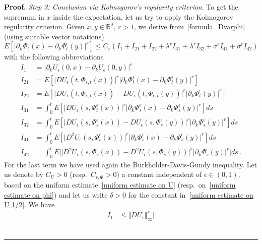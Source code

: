 \documentclass[a4paper,10pt]{article}
\newenvironment{proof}[1][Proof]{\noindent\textbf{#1.} }{\ \rule{0.5em}{0.5em}}
\begin{document}
\begin{proof}
\emph{Step 3: Conclusion via Kolmogorov's regularity criterion}. To get the supremum in $x$ inside the expectation, let us try
to apply the Kolmogorov regularity criterion. Given $x,y\in\mathbb{R}^{d}$, $r>1$,
we derive from~\eqref{formula_Dvarphi} (using suitable vector notations)
\[
E[  \vert \partial_{k}\Phi^{\epsilon}_{t}(x)
-\partial_{k}\Phi^{\epsilon}_{t}(  y)  \vert ^{r}]
\leq C_{r}(  I_{1}+I_{21}+I_{22}+\lambda^{r}I_{31}+\lambda^{r} 
I_{32}+\sigma^{r}I_{41}+\sigma^{r}I_{42})
\]
with the following abbreviations
\begin{align*}
I_{1} & =\vert \partial_{k}U_{\epsilon}(  0,x)  -\partial
_{k}U_{\epsilon}(  0,y)  \vert ^{r} \\[0.1cm]
I_{21}  & =E[  \vert DU_{\epsilon}(  t,\Phi_{\epsilon
,t}(x)  )  \vert ^{r}\vert \partial_{k} 
\Phi^{\epsilon}_{t}(x)  -\partial_{k}\Phi^{\epsilon}_{t}(
y)  \vert ^{r}]  \\[0.1cm]
I_{22}  & =E[  \vert DU_{\epsilon}(  t,\Phi_{\epsilon
,t}(x)  )  -DU_{\epsilon}(  t,\Phi_{\epsilon
,t}(  y)  )  \vert ^{r}\vert \partial_{k}
\Phi^{\epsilon}_{t}(  y)  \vert ^{r}] \\
I_{31}  & =\int_{0}^{t}E[  \vert DU_{\epsilon}(  s,\Phi
^{\epsilon}_{t}(x)  )  \vert ^{r}\vert
\partial_{k}\Phi^{\epsilon}_{s}(x)  -\partial_{k}\Phi
^{\epsilon}_{s}(  y)  \vert ^{r}]  ds\\
I_{32}  & =\int_{0}^{t}E[  \vert DU_{\epsilon}(  s,\Phi
^{\epsilon}_{s}(x)  )  -DU_{\epsilon}(  s,\Phi
^{\epsilon}_{s}(  y)  )  \vert ^{r}\vert
\partial_{k}\Phi^{\epsilon}_{s}(  y)  \vert ^{r}]  ds \\
I_{41}  & =\int_{0}^{t}E[  \vert D^{2}U_{\epsilon}(
s,\Phi^{\epsilon}_{t}(x)  )  \vert ^{r}\vert
\partial_{k}\Phi^{\epsilon}_{s}(x)  -\partial_{k}\Phi
^{\epsilon}_{s}(  y)  \vert ^{r}]  ds\\
I_{42}  & =\int_{0}^{t}E\big[  \vert D^{2}U_{\epsilon}(
s,\Phi^{\epsilon}_{s}(x)  )  -D^{2}U_{\epsilon}(
s,\Phi^{\epsilon}_{s}(  y)  )  \vert ^{r}\vert
\partial_{k}\Phi^{\epsilon}_{s}(  y)  \vert ^{r}\big]  ds \,.
\end{align*}
For the last term we have used again the Burkholder-Davis-Gundy inequality. 
Let us denote by $C_{U}>0$ (resp.\ $C_{r,\Phi}>0$) a constant
independent of $\epsilon \in (0,1)$, based on the uniform
estimate~\eqref{uniform estimate on U} (resp.\ on~\eqref{uniform estimate on phi}) and let us write $\delta>0$ for the constant in~\eqref{uniform estimate on U 1/2}. We have
\begin{align*}
I_{1} & \leq\Vert DU_{\varepsilon}\Vert _{\infty}^{r}\vert

\end{align*}
\end{proof}
\end{document}
